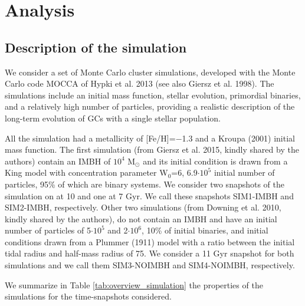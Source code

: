 \section{Analysis}

\subsection{Description of the simulation}
We consider a set of Monte Carlo cluster simulations, developed with the Monte Carlo
code MOCCA of Hypki et al. 2013 (see also Giersz et al. 1998). The simulations
include an initial mass function, stellar evolution, primordial binaries, and a
relatively high number of particles, providing a realistic description of the
long-term evolution of \acp{GC} with a single stellar population.

All the simulation had a metallicity of [Fe/H]=$-$1.3 and a Kroupa (2001) initial
mass function. The first simulation (from Giersz et al. 2015, kindly shared by the
authors) contain an \ac{IMBH} of $10^4$ M$_\odot$ and its initial condition is drawn from a
King model with concentration parameter W$_0 $=6, 6.9$\cdot10^5$ initial number of particles,
95\% of which are binary systems. We consider two snapshots of the simulation on at
10 and one at 7 Gyr. We call these snapshots SIM1-IMBH and SIM2-IMBH, respectively.
Other two simulations (from Downing et al. 2010, kindly shared by the authors), do
not contain an \ac{IMBH} and have an initial number of particles of 5$\cdot10^5$ and 2$\cdot10^6$, 10\%
of initial binaries, and initial conditions drawn from a Plummer (1911) model with a
ratio between the initial tidal radius and half-mass radius of 75. We consider a 11
Gyr snapshot for both simulations and we call them SIM3-NOIMBH and SIM4-NOIMBH,
respectively.

We summarize in Table \ref{tab:overview_simulation} the properties of the simulations for the time-snapshots
considered. 


